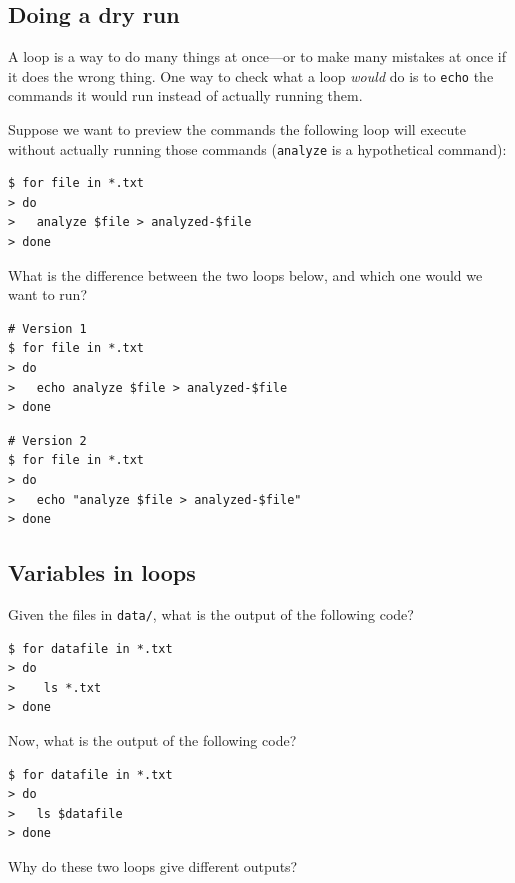 \documentclass[
]{krantz}
\begin{document}
\hypertarget{bash-basics-ex-loop-dry-run}{%
\subsection{Doing a dry run}\label{bash-basics-ex-loop-dry-run}}

A loop is a way to do many things at once---or to make many mistakes at
once if it does the wrong thing. One way to check what a loop \emph{would} do
is to \texttt{echo} the commands it would run instead of actually running them.

Suppose we want to preview the commands the following loop will execute
without actually running those commands
(\texttt{analyze} is a hypothetical command):

\begin{verbatim}
$ for file in *.txt
> do
>   analyze $file > analyzed-$file
> done
\end{verbatim}

What is the difference between the two loops below, and which one would we
want to run?

\begin{verbatim}
# Version 1
$ for file in *.txt
> do
>   echo analyze $file > analyzed-$file
> done
\end{verbatim}

\begin{verbatim}
# Version 2
$ for file in *.txt
> do
>   echo "analyze $file > analyzed-$file"
> done
\end{verbatim}

\hypertarget{bash-basics-ex-loop-variables}{%
\subsection{Variables in loops}\label{bash-basics-ex-loop-variables}}

Given the files in \texttt{data/},
what is the output of the following code?

\begin{verbatim}
$ for datafile in *.txt
> do
>    ls *.txt
> done
\end{verbatim}

Now, what is the output of the following code?

\begin{verbatim}
$ for datafile in *.txt
> do
>   ls $datafile
> done
\end{verbatim}

Why do these two loops give different outputs?
\end{document}
